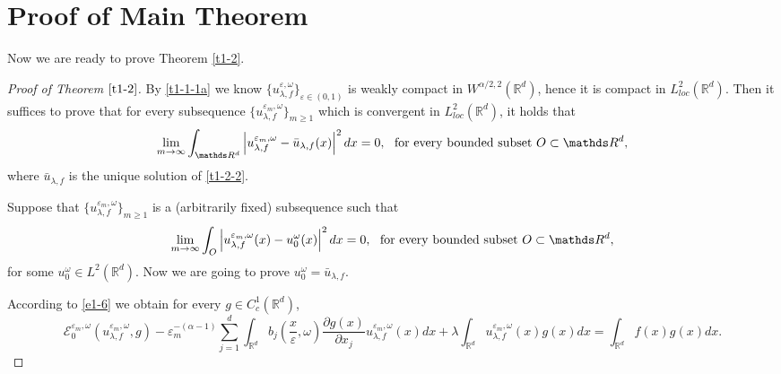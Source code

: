 \documentclass[11pt,draft, reqno]{amsart}
\renewcommand{\ge}{\geqslant}
\def\EE{{\mathcal E}}
\newcommand{\R}{\mathds R}
\newcommand{\e}{\varepsilon}
\newcommand{\w}{\omega}
\theoremstyle{definition}
\numberwithin{equation}{section}
\begin{document}
\section{Proof of Main Theorem}
Now we are ready to prove Theorem \ref{t1-2}.
\begin{proof} [Proof of Theorem $\ref{t1-2}$]
By \eqref{t1-1-1a} we know $\{u_{\lambda,f}^{\e,\w}\}_{\e\in (0,1)}$ is weakly compact in
$W^{\alpha/2,2}(\R^d)$, hence it is compact in $L_{loc}^2(\R^d)$. Then it suffices to prove that for every
subsequence $\{u_{\lambda,f}^{\e_m,\w}\}_{m\ge 1}$ which is convergent in $L_{loc}^2(\R^d)$, it holds that
\begin{equation*}
\lim_{m \to \infty}\int_{\R^d}\left|u_{\lambda,f}^{\e_m,\w}-\bar u_{\lambda,f}(x)\right|^2dx=0, \ \ {\rm for\ every\ bounded\ subset}\ O\subset \R^d,
\end{equation*}
where $\bar u_{\lambda,f}$ is the unique solution of \eqref{t1-2-2}.

Suppose that $\{u_{\lambda,f}^{\e_m,\w}\}_{m\ge 1}$ is a (arbitrarily fixed) subsequence such that
\begin{equation}\label{t1-2-3}
\lim_{m \to \infty}\int_{O}\left|u_{\lambda,f}^{\e_m,\w}(x)-u_0^{\w}(x)\right|^2dx=0,\ \ {\rm for\ every\ bounded\ subset}\ O\subset \R^d,
\end{equation}
for some $u_0^{\w}\in L^2(\R^d)$. Now we are going to prove $u_0^{\w}=\bar u_{\lambda,f}$.

According to \eqref{e1-6} we obtain for every $g\in C_c^1(\R^d)$,
\begin{equation}\label{t1-2-4}
\EE_0^{\e_m,\w}(u_{\lambda,f}^{\e_m,\w},g)-
\e_m^{-(\alpha-1)}\sum_{j=1}^d\int_{\R^d}b_j\left(\frac{x}{\e},\w\right)\frac{\partial g(x)}{\partial x_j}u_{\lambda,f}^{\e_m,\w}(x)dx
+\lambda\int_{\R^d}u_{\lambda,f}^{\e_m,\w}(x)g(x)dx=\int_{\R^d}f(x)g(x)dx.
\end{equation}


\end{proof}
\end{document}
